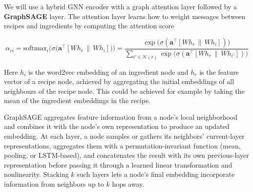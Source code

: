 \documentclass{article}
\begin{document}
We will use a hybrid GNN encoder with a graph attention layer followed by a  \textbf{GraphSAGE} layer. The attention layer learns how to weight messages between recipes and ingredients by computing the attention score

$$\alpha_{ri} = \text{softmax}_i\Big(\sigma\big(\mathbf{a}^\top [W h_r \, \| \, W h_i]\big)\Big) = \frac{\exp\big(\sigma(\mathbf{a}^\top [W h_r \, \| \, W h_i])\big)}{\sum_{i' \in \mathcal{N}(r)} \exp\big(\sigma(\mathbf{a}^\top [W h_r \, \| \, W h_{i'}])\big)}$$

Here $h_i$ is the word2vec embedding of an ingredient node and $h_r$ is the feature vector of a recipe node, achieved by aggregating the initial embeddings of all neighbours of the recipe node. This could be achieved for example by taking the mean of the ingredient embeddings in the recipe. 
 




GraphSAGE aggregates feature information from a node's local neighborhood and combines it with the node's own representation to produce an updated embedding. At each layer, a node samples or gathers its neighbors' current-layer representations, aggregates them with a permutation-invariant function (mean, pooling, or LSTM-based), and concatenates the result with its own previous-layer representation before passing it through a learned linear transformation and nonlinearity. Stacking $k$ such layers lets a node's final embedding incorporate information from neighbors up to $k$ hops away.
\end{document}
